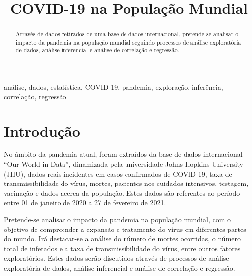 \documentclass[conference]{IEEEtran}
\begin{document}
\title{COVID-19 na População Mundial\\
}

\author{
\and
{}
}

\maketitle

\begin{abstract}
Através de dados retirados de uma base de dados internacional, pretende-se analisar o impacto da pandemia na população mundial seguindo processos de análise exploratória de dados, análise inferencial e análise de correlação e regressão.
\end{abstract}

\begin{IEEEkeywords}
análise, dados, estatística, COVID-19, pandemia, exploração, inferência, correlação, regressão
\end{IEEEkeywords}

\section{Introdução} 
No âmbito da pandemia atual, foram extraídos da base de dados internacional “Our World in Data”\cite{database}, dinamizada pela universidade Johns Hopkins University (JHU), dados reais incidentes em casos confirmados de COVID-19, taxa de transmissibilidade do vírus, mortes, pacientes nos cuidados intensivos, testagem, vacinação e dados acerca da população. Estes dados são referentes ao período entre 01 de janeiro de 2020 a 27 de fevereiro de 2021.

Pretende-se analisar o impacto da pandemia na população mundial, com o objetivo de compreender a expansão e tratamento do vírus em diferentes partes do mundo. Irá destacar-se a análise do número de mortes ocorridas, o número total de infetados e a taxa de transmissibilidade do vírus, entre outros fatores exploratórios. Estes dados serão discutidos através de processos de análise exploratória de dados, análise inferencial e análise de correlação e regressão.
\end{document}
